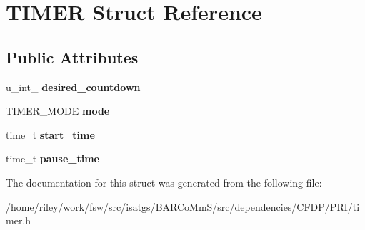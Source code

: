 \hypertarget{struct_t_i_m_e_r}{}\section{T\+I\+M\+ER Struct Reference}
\label{struct_t_i_m_e_r}
\subsection*{Public Attributes}
\begin{DoxyCompactItemize}
\item 
u\+\_\+int\+\_ {\bfseries desired\+\_\+countdown}\hypertarget{struct_t_i_m_e_r_a2c86c74efaa471d7891b6abbc2a0800a}{}\label{struct_t_i_m_e_r_a2c86c74efaa471d7891b6abbc2a0800a}

\item 
T\+I\+M\+E\+R\+\_\+\+M\+O\+DE {\bfseries mode}\hypertarget{struct_t_i_m_e_r_ac25f3daa9a29ceb01edc1b6fd6c4b226}{}\label{struct_t_i_m_e_r_ac25f3daa9a29ceb01edc1b6fd6c4b226}

\item 
time\+\_\+t {\bfseries start\+\_\+time}\hypertarget{struct_t_i_m_e_r_af931690fbfef858ae0c520ab0d6c4348}{}\label{struct_t_i_m_e_r_af931690fbfef858ae0c520ab0d6c4348}

\item 
time\+\_\+t {\bfseries pause\+\_\+time}\hypertarget{struct_t_i_m_e_r_a6dd704eb00e3f51fbd1b880b5ede0440}{}\label{struct_t_i_m_e_r_a6dd704eb00e3f51fbd1b880b5ede0440}

\end{DoxyCompactItemize}


The documentation for this struct was generated from the following file\+:\begin{DoxyCompactItemize}
\item 
/home/riley/work/fsw/src/isatgs/\+B\+A\+R\+Co\+Mm\+S/src/dependencies/\+C\+F\+D\+P/\+P\+R\+I/timer.\+h\end{DoxyCompactItemize}
